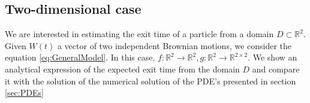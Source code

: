 \subsection{Two-dimensional case}
We are interested in estimating the exit time of a particle from a domain $D\subset\mathbb{R}^2$. Given $W(t)$ a  vector of two independent Brownian motions, we consider the equation \eqref{eq:GeneralModel}. In this case, $f\colon \mathbb{R}^2 \rightarrow \mathbb{R}^2, g\colon \mathbb{R}^2 \rightarrow \mathbb{R}^{2\times 2}$. We show an analytical expression of the expected exit time from the domain $D$ and compare it with the solution of the numerical solution of the PDE's presented in section \ref{sec:PDEs}




